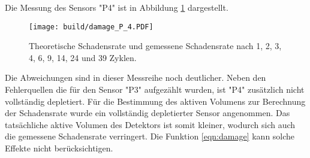 Die Messung des Sensors "P4" ist in Abbildung \ref{fig:P_4}
dargestellt.

\begin{figure}
  \centering
    \texttt{[image: build/damage\_P\_4.PDF]}
\caption{Theoretische Schadensrate und gemessene Schadensrate nach 1, 2, 3, 4, 6, 9, 14, 24 und 39 Zyklen.}
\label{fig:P_4}
\end{figure}

Die Abweichungen sind in dieser Messreihe noch deutlicher. Neben den Fehlerquellen die
für den Sensor "P3" aufgezählt wurden, ist "P4" zusätzlich nicht vollständig depletiert.
Für die Bestimmung des aktiven Volumens zur Berechnung der Schadensrate wurde ein vollständig
depletierter Sensor angenommen. Das tatsächliche aktive Volumen des Detektors ist somit kleiner, wodurch sich auch
die gemessene Schadensrate verringert.
Die Funktion \ref{eqn:damage} kann solche Effekte nicht berücksichtigen.
